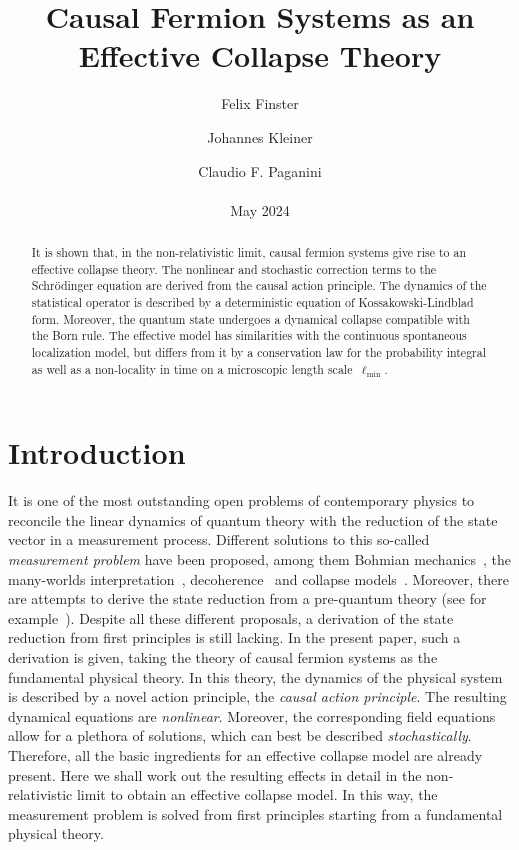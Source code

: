 \documentclass[reqno,11pt]{amsart}
\title[Causal Fermion Systems as an Effective Collapse Theory]{Causal Fermion Systems as an \\ Effective Collapse Theory}
\author[F.\ Finster]{Felix Finster}
\author[J.\ Kleiner]{Johannes Kleiner}
\author[C.F.\ Paganini]{Claudio F. Paganini \\ \\ May 2024}
\numberwithin{equation}{section}
\newcommand{\1}{\mathds{1}}
\begin{document}
\maketitle

\begin{abstract}
It is shown that, in the non-relativistic limit, causal fermion systems give rise to an effective collapse theory. The nonlinear and stochastic correction terms to the Schr\"odinger equation are derived from the causal action principle. The dynamics of the statistical operator is described by a deterministic equation of Kossakowski-Lindblad form. Moreover, the quantum state undergoes a dynamical collapse compatible with the Born rule. The effective model has similarities with the continuous spontaneous localization model, but differs from it by a conservation law for the probability integral as well as a non-locality in time on a microscopic length scale~$\ell_{\min}$.
\end{abstract}

\tableofcontents

\section{Introduction} \label{secintro} 
It is one of the most outstanding open problems of contemporary physics to reconcile the linear dynamics
of quantum theory with the reduction of the state vector in a measurement process.
Different solutions to this so-called {\em{measurement problem}} have been proposed,
among them Bohmian mechanics~\cite{duerr+teufel}, the many-worlds interpretation~\cite{dewitt-manyworlds},
decoherence~\cite{joos} and collapse models~\cite{gao}.
Moreover, there are attempts to derive the state reduction from a pre-quantum theory
(see for example~\cite{thooft1, thooft2, khrennikov, khrennikov2}).
Despite all these different proposals, a derivation of the state reduction from first principles is still lacking.
In the present paper, such a derivation is given, taking the theory of causal fermion systems as the fundamental
physical theory. In this theory, the dynamics of the physical system is described by
a novel action principle, the {\em{causal action principle}}. The resulting dynamical equations
are {\em{nonlinear}}. Moreover, the corresponding field equations allow for a plethora of solutions,
which can best be described {\em{stochastically}}.
Therefore, all the basic ingredients for an effective collapse
model are already present. Here we shall work out the resulting effects in detail
in the non-relativistic limit to obtain an effective collapse model.
In this way, the measurement problem is solved from first principles
starting from a fundamental physical theory.
\end{document}
